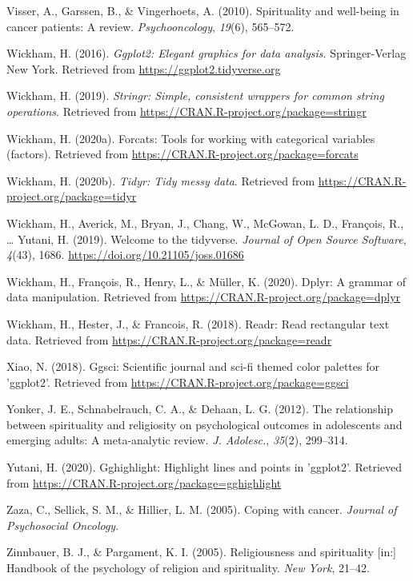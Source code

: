 \documentclass[
  english,
  man,floatsintext]{apa6}
\begin{document}
\leavevmode\hypertarget{ref-Visser2010-kq}{}%
Visser, A., Garssen, B., \& Vingerhoets, A. (2010). Spirituality and well-being in cancer patients: A review. \emph{Psychooncology}, \emph{19}(6), 565--572.

\leavevmode\hypertarget{ref-R-ggplot2}{}%
Wickham, H. (2016). \emph{Ggplot2: Elegant graphics for data analysis}. Springer-Verlag New York. Retrieved from \url{https://ggplot2.tidyverse.org}

\leavevmode\hypertarget{ref-R-stringr}{}%
Wickham, H. (2019). \emph{Stringr: Simple, consistent wrappers for common string operations}. Retrieved from \url{https://CRAN.R-project.org/package=stringr}

\leavevmode\hypertarget{ref-R-forcats}{}%
Wickham, H. (2020a). Forcats: Tools for working with categorical variables (factors). Retrieved from \url{https://CRAN.R-project.org/package=forcats}

\leavevmode\hypertarget{ref-R-tidyr}{}%
Wickham, H. (2020b). \emph{Tidyr: Tidy messy data}. Retrieved from \url{https://CRAN.R-project.org/package=tidyr}

\leavevmode\hypertarget{ref-R-tidyverse}{}%
Wickham, H., Averick, M., Bryan, J., Chang, W., McGowan, L. D., François, R., \ldots{} Yutani, H. (2019). Welcome to the tidyverse. \emph{Journal of Open Source Software}, \emph{4}(43), 1686. \url{https://doi.org/10.21105/joss.01686}

\leavevmode\hypertarget{ref-R-dplyr}{}%
Wickham, H., François, R., Henry, L., \& Müller, K. (2020). Dplyr: A grammar of data manipulation. Retrieved from \url{https://CRAN.R-project.org/package=dplyr}

\leavevmode\hypertarget{ref-R-readr}{}%
Wickham, H., Hester, J., \& Francois, R. (2018). Readr: Read rectangular text data. Retrieved from \url{https://CRAN.R-project.org/package=readr}

\leavevmode\hypertarget{ref-R-ggsci}{}%
Xiao, N. (2018). Ggsci: Scientific journal and sci-fi themed color palettes for 'ggplot2'. Retrieved from \url{https://CRAN.R-project.org/package=ggsci}

\leavevmode\hypertarget{ref-Yonker2012-zg}{}%
Yonker, J. E., Schnabelrauch, C. A., \& Dehaan, L. G. (2012). The relationship between spirituality and religiosity on psychological outcomes in adolescents and emerging adults: A meta-analytic review. \emph{J. Adolesc.}, \emph{35}(2), 299--314.

\leavevmode\hypertarget{ref-R-gghighlight}{}%
Yutani, H. (2020). Gghighlight: Highlight lines and points in 'ggplot2'. Retrieved from \url{https://CRAN.R-project.org/package=gghighlight}

\leavevmode\hypertarget{ref-Zaza2005-ac}{}%
Zaza, C., Sellick, S. M., \& Hillier, L. M. (2005). Coping with cancer. \emph{Journal of Psychosocial Oncology}.

\leavevmode\hypertarget{ref-Zinnbauer2005-vz}{}%
Zinnbauer, B. J., \& Pargament, K. I. (2005). Religiousness and spirituality {[}in:{]} Handbook of the psychology of religion and spirituality. \emph{New York}, 21--42.

\endgroup
\end{document}
